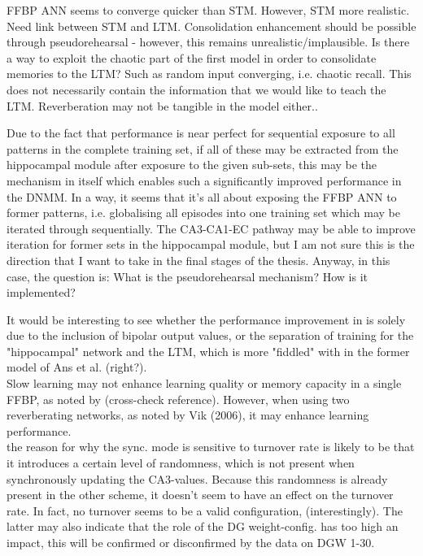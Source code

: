 FFBP ANN seems to converge quicker than STM. However, STM more realistic. Need link between STM and LTM. Consolidation enhancement should be possible through pseudorehearsal - however, this remains unrealistic/implausible.
Is there a way to exploit the chaotic part of the first model in order to consolidate memories to the LTM? Such as random input converging, i.e. chaotic recall. This does not necessarily contain the information that we would like to teach the LTM. Reverberation may not be tangible in the model either..

Due to the fact that performance is near perfect for sequential exposure to all patterns in the complete training set, if all of these may be extracted from the hippocampal module after exposure to the given sub-sets, this may be the mechanism in itself which enables such a significantly improved performance in the DNMM. In a way, it seems that it's all about exposing the FFBP ANN to former patterns, i.e. globalising all episodes into one training set which may be iterated through sequentially. The CA3-CA1-EC pathway may be able to improve iteration for former sets in the hippocampal module, but I am not sure this is the direction that I want to take in the final stages of the thesis. Anyway, in this case, the question is: What is the pseudorehearsal mechanism? How is it implemented?

It would be interesting to see whether the performance improvement in \cite{Hattori2010, Hattori2014} is solely due to the inclusion of bipolar output values, or the separation of training for the "hippocampal" network and the LTM, which is more "fiddled" with in the former model of Ans et al. (right?).
\\

Slow learning may not enhance learning quality or memory capacity in a single FFBP, as noted by \cite{Ans1997} (cross-check reference). However, when using two reverberating networks, as noted by Vik (2006), it may enhance learning performance.
\\

the reason for why the sync. mode is sensitive to turnover rate is likely to be that it introduces a certain level of randomness, which is not present when synchronously updating the CA3-values. Because this randomness is already present in the other scheme, it doesn't seem to have an effect on the turnover rate. In fact, no turnover seems to be a valid configuration, (interestingly). The latter may also indicate that the role of the DG weight-config. has too high an impact, this will be confirmed or disconfirmed by the data on DGW 1-30.

